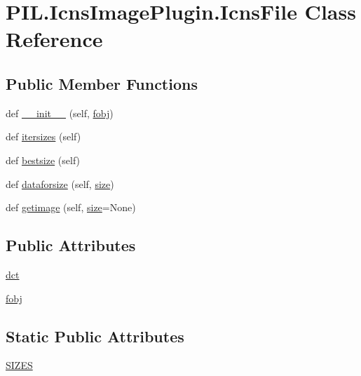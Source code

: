 \hypertarget{classPIL_1_1IcnsImagePlugin_1_1IcnsFile}{}\section{P\+I\+L.\+Icns\+Image\+Plugin.\+Icns\+File Class Reference}
\label{classPIL_1_1IcnsImagePlugin_1_1IcnsFile}
\subsection*{Public Member Functions}
\begin{DoxyCompactItemize}
\item 
def \hyperlink{classPIL_1_1IcnsImagePlugin_1_1IcnsFile_a0162bc6723c1cc46a22a21925398825e}{\+\_\+\+\_\+init\+\_\+\+\_\+} (self, \hyperlink{classPIL_1_1IcnsImagePlugin_1_1IcnsFile_a0f5b37f0be24819e072b8b242c428e60}{fobj})
\item 
def \hyperlink{classPIL_1_1IcnsImagePlugin_1_1IcnsFile_a79e4a75533d638a58bd818ee749cc42d}{itersizes} (self)
\item 
def \hyperlink{classPIL_1_1IcnsImagePlugin_1_1IcnsFile_ada3671e752b0d394a57a6da3c8fc7b52}{bestsize} (self)
\item 
def \hyperlink{classPIL_1_1IcnsImagePlugin_1_1IcnsFile_aa34257f45415cb40fe61cbc1d5deb5b7}{dataforsize} (self, \hyperlink{namespacePIL_1_1IcnsImagePlugin_af38cbea1c9c068b8c6603f57be6b4040}{size})
\item 
def \hyperlink{classPIL_1_1IcnsImagePlugin_1_1IcnsFile_aa483609480199a077ccfc66664cdb412}{getimage} (self, \hyperlink{namespacePIL_1_1IcnsImagePlugin_af38cbea1c9c068b8c6603f57be6b4040}{size}=None)
\end{DoxyCompactItemize}
\subsection*{Public Attributes}
\begin{DoxyCompactItemize}
\item 
\hyperlink{classPIL_1_1IcnsImagePlugin_1_1IcnsFile_acc63b319c467e5270636babc8ee4302f}{dct}
\item 
\hyperlink{classPIL_1_1IcnsImagePlugin_1_1IcnsFile_a0f5b37f0be24819e072b8b242c428e60}{fobj}
\end{DoxyCompactItemize}
\subsection*{Static Public Attributes}
\begin{DoxyCompactItemize}
\item 
\hyperlink{classPIL_1_1IcnsImagePlugin_1_1IcnsFile_a30f60bf5823127f1176ea82d4826dfd4}{S\+I\+Z\+ES}
\end{DoxyCompactItemize}


